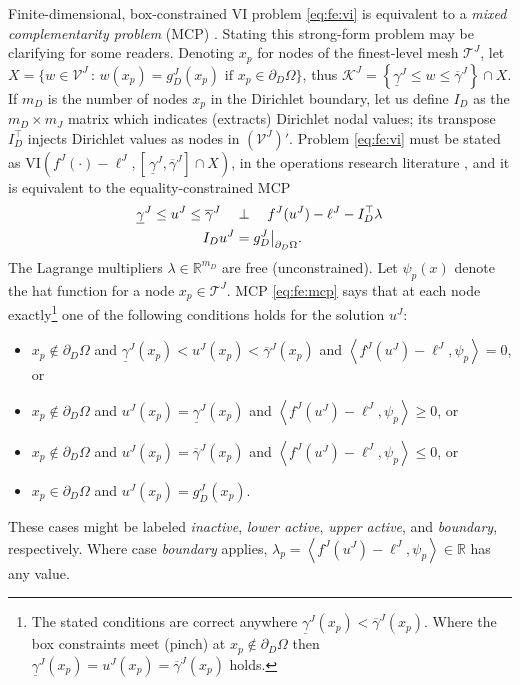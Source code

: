 \documentclass[letterpaper,final,12pt,reqno]{amsart}
\theoremstyle{cstyle}
\theoremstyle{cstyle*}
\theoremstyle{dstyle}
\numberwithin{equation}{section}
\numberwithin{figure}{section}
\numberwithin{table}{section}
\numberwithin{theorem}{section}
\newcommand{\RR}{\mathbb{R}}
\newcommand{\cK}{\mathcal{K}}
\newcommand{\cV}{\mathcal{V}}
\newcommand{\ip}[2]{\left<#1,#2\right>}
\begin{document}
Finite-dimensional, box-constrained VI problem \eqref{eq:fe:vi} is equivalent to a \emph{mixed complementarity problem} (MCP) \cite{FacchineiPang2003,FerrisPang1997}.  Stating this strong-form problem may be clarifying for some readers.  Denoting $x_p$ for nodes of the finest-level mesh $\mathcal{T}^J$, let $X=\big\{w\in\cV^J\,:\,w(x_p)=g_D^J(x_p) \text{ if } x_p\in \partial_D\Omega\big\}$, thus $\cK^J = \left\{\underline{\gamma}^J \le w \le \overline{\gamma}^J\right\} \cap X$.  If $m_D$ is the number of nodes $x_p$ in the Dirichlet boundary, let us define $I_D$ as the $m_D\times m_J$ matrix which indicates (extracts) Dirichlet nodal values; its transpose $I_D^\top$ injects Dirichlet values as nodes in $(\mathcal{V}^J)'$.  Problem \eqref{eq:fe:vi} must be stated as VI$\left(f^J(\cdot)-\ell^J,\left[\,\underline{\gamma}^J,\overline{\gamma}^J\right] \cap X\right)$, in the operations research literature \cite{FerrisPang1997}, and it is equivalent to the equality-constrained MCP
\begin{align}
\underline{\gamma}^J \le u^J \le \overline{\gamma}^J \quad &\perp \quad f^J(u^J) - \ell^J - I_D^\top \lambda \label{eq:fe:mcp} \\
I_D u^J &= g_D^J\big|_{\partial_D\Omega}. \notag
\end{align}
The Lagrange multipliers $\lambda \in \RR^{m_D}$ are free (unconstrained).  Let $\psi_p(x)$ denote the hat function for a node $x_p \in \mathcal{T}^J$.  MCP \eqref{eq:fe:mcp} says that at each node exactly\footnote{The stated conditions are correct anywhere $\underline{\gamma}^J(x_p) < \overline{\gamma}^J(x_p)$.  Where the box constraints meet (pinch) at $x_p \notin \partial_D\Omega$ then $\underline{\gamma}^J(x_p)=u^J(x_p)=\overline{\gamma}^J(x_p)$ holds.} one of the following conditions holds for the solution $u^J$:
\begin{itemize}
\item $x_p \notin \partial_D\Omega$ and $\underline{\gamma}^J(x_p)<u^J(x_p)<\overline{\gamma}^J(x_p)$ and $\ip{f^J(u^J)-\ell^J}{\psi_p} = 0$, or
\item $x_p \notin \partial_D\Omega$ and $u^J(x_p)=\underline{\gamma}^J(x_p)$ and $\ip{f^J(u^J)-\ell^J}{\psi_p} \ge 0$, or
\item $x_p \notin \partial_D\Omega$ and $u^J(x_p)=\overline{\gamma}^J(x_p)$ and $\ip{f^J(u^J)-\ell^J}{\psi_p} \le 0$, or
\item $x_p \in \partial_D\Omega$ and $u^J(x_p)=g_D^J(x_p)$.
\end{itemize}
These cases might be labeled \emph{inactive}, \emph{lower active}, \emph{upper active}, and \emph{boundary}, respectively.  Where case \emph{boundary} applies, $\lambda_p=\ip{f^J(u^J)-\ell^J}{\psi_p}\in\RR$ has any value.
\end{document}
